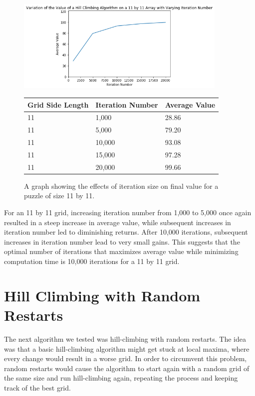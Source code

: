 \documentclass[12pt]{article}
\begin{document}
\begin{figure}[H]
    \centering
    \includegraphics[width=0.9\textwidth]{hill_climbing_11x11_iterations}
\begin{tabular}{ |p{4cm}||p{4cm}|p{4cm}|  }
 \hline
Grid Side Length& Iteration Number &Average Value\\
 \hline
11&1,000&28.86\\
11&5,000&79.20\\
11&10,000&93.08\\
11&15,000&97.28\\
11&20,000&99.66\\
 \hline
\end{tabular}
    \caption{A graph showing the effects of iteration size on final value for a puzzle of size 11 by 11.}
    \label{fig:hill_climbing_11x11_iterations}
\end{figure}



For an 11 by 11 grid, increasing iteration number from 1,000 to 5,000 once again resulted in a steep increase in average value, while subsequent increases in iteration number led to diminishing returns. After 10,000 iterations, subsequent increases in iteration number lead to very small gains. This suggests that the optimal number of iterations that maximizes average value while minimizing computation time is 10,000 iterations for a 11 by 11 grid.



\section*{Hill Climbing with Random Restarts}

The next algorithm we tested was hill-climbing with random restarts. The idea was that a basic hill-climbing algorithm might get stuck at local maxima, where every change would result in a worse grid. In order to circumvent this problem, random restarts would cause the algorithm to start again with a random grid of the same size and run hill-climbing again, repeating the process and keeping track of the best grid.
\end{document}
